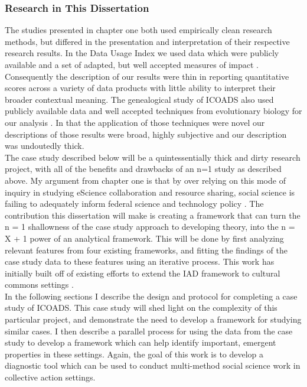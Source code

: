 \documentclass[thesis,tocnosub,noragright,centerchapter,12pt]{uiucecethesis09}
\begin{document}
{\subsubsection*{Research in This Dissertation}

The studies presented in chapter one both used empirically clean
research methods, but differed in the presentation and interpretation
of their respective research results. In the Data Usage Index we used data which were publicly available and a set of adapted, but well accepted measures of
impact \citep{weber2013product}. Consequently the description of our results were thin in
reporting quantitative scores across a variety of data products with
little ability to interpret their broader contextual meaning. The genealogical study of ICOADS also used publicly available data and well accepted 
techniques from evolutionary biology for our analysis \citep{thomer2014phylo}. In that the application of those techniques were novel our descriptions of those results were broad, highly subjective and our description was undoutedly thick.\\

The case study described below will be a quintessentially thick and
dirty research project, with all of the benefits and drawbacks of an n=1
study as described above. My argument from chapter one is that by over
relying on this mode of inquiry in studying eScience collaboration and
resource sharing, social science is failing to adequately inform federal
science and technology policy \citep{jackson2013cscw}.
The contribution this dissertation will make is creating a framework that can turn the n = 1 shallowness of the case study approach to developing theory, into the n = X + 1 power of an analytical framework. This will be done by first analyzing relevant features from four existing frameworks, and fitting the findings of the case study data to these features using an iterative process. This work has initially built off of existing efforts to extend the IAD framework to cultural commons settings \citep[e.g.]{adison2010constructing}.\\

In the following sections I describe the design and protocol for completing a case study of ICOADS. This case study will shed light on the complexity of this particular project, and demonstrate the need to develop a framework for studying similar cases. I then describe a parallel process for using the data from the case study to develop a framework which can help identify important, emergent properties in these settings. Again, the goal of this work is to develop a diagnostic tool which can be used to conduct multi-method social science work in collective action settings.\\

}
\end{document}
